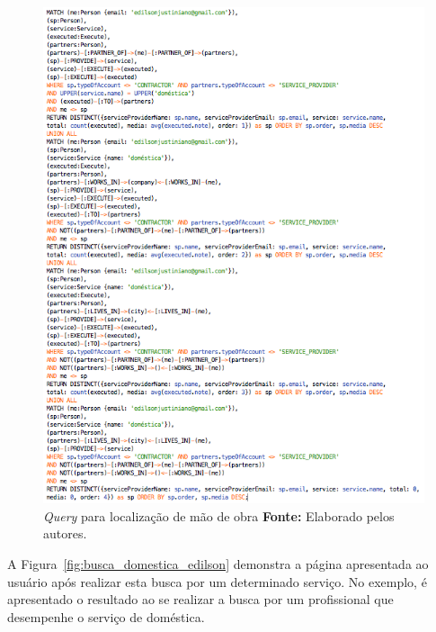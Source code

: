 \newpage
\begin{figure}[h!]
	\centerline{\includegraphics[scale=0.7]{./imagens/consulta-busca-domestica.png}}
	\caption[\textit{Query} para localização de mão de obra.]
	{\textit{Query} para localização de mão de obra \textbf{Fonte:} Elaborado pelos autores.}
	\label{fig:consulta_busca}
\end{figure}

\par A Figura~\ref{fig:busca_domestica_edilson} demonstra a página apresentada ao usuário após realizar esta busca por um determinado serviço. No exemplo, é apresentado o resultado ao se realizar a busca por um profissional que desempenhe o serviço de doméstica.

